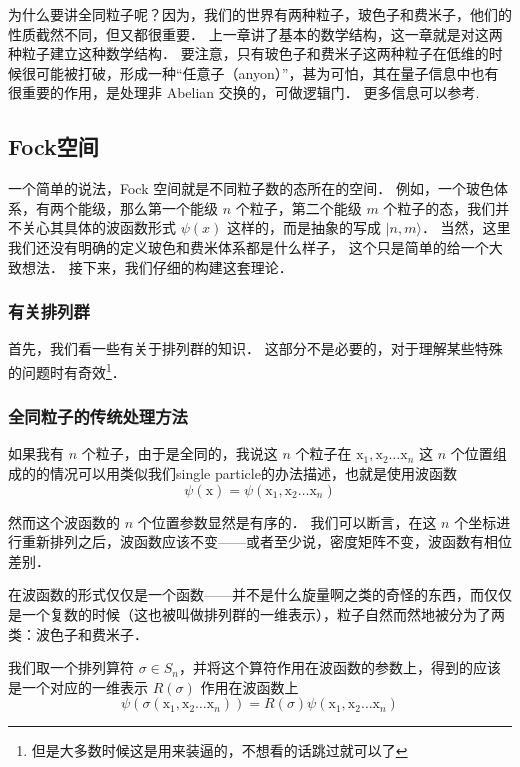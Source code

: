 
为什么要讲全同粒子呢？因为，我们的世界有两种粒子，玻色子和费米子，他们的性质截然不同，但又都很重要． 上一章讲了基本的数学结构，这一章就是对这两种粒子建立这种数学结构． 要注意，只有玻色子和费米子这两种粒子在低维的时候很可能被打破，形成一种“任意子（anyon）”，甚为可怕，其在量子信息中也有很重要的作用，是处理非 Abelian 交换的，可做逻辑门． 更多信息可以参考\cite{Nayak2008}.

\subsection{Fock空间}

一个简单的说法，Fock 空间就是不同粒子数的态所在的空间． 例如，一个玻色体系，有两个能级，那么第一个能级 $n$ 个粒子，第二个能级 $m$ 个粒子的态，我们并不关心其具体的波函数形式 $\psi(x)$ 这样的，而是抽象的写成 $|n,m\rangle$． 当然，这里我们还没有明确的定义玻色和费米体系都是什么样子， 这个只是简单的给一个大致想法． 接下来，我们仔细的构建这套理论．

\subsubsection{有关排列群}

首先，我们看一些有关于排列群的知识． 这部分不是必要的，对于理解某些特殊的问题时有奇效\footnote{但是大多数时候这是用来装逼的，不想看的话跳过就可以了}．

\subsubsection{全同粒子的传统处理方法}

如果我有 $n$ 个粒子，由于是全同的，我说这 $n$ 个粒子在 ${\mathrm x}_1, {\mathrm x}_2 \dots {\mathrm x}_n$ 这 $n$ 个位置组成的的情况可以用类似我们single particle的办法描述，也就是使用波函数
\begin{equation}
\psi({\mathrm x}) = \psi({\mathrm x}_1, {\mathrm x}_2\dots {\mathrm x}_n)
\end{equation}

然而这个波函数的 $n$ 个位置参数显然是有序的． 我们可以断言，在这 $n$ 个坐标进行重新排列之后，波函数应该不变——或者至少说，密度矩阵不变，波函数有相位差别．

在波函数的形式仅仅是一个函数——并不是什么旋量啊之类的奇怪的东西，而仅仅是一个复数的时候（这也被叫做排列群的一维表示），粒子自然而然地被分为了两类：波色子和费米子．

我们取一个排列算符 $\sigma\in S_n$，并将这个算符作用在波函数的参数上，得到的应该是一个对应的一维表示 $R(\sigma)$ 作用在波函数上
\begin{equation}
\psi(\sigma ({\mathrm x}_1, {\mathrm x}_2\dots{\mathrm x}_n)) = R(\sigma)\psi({\mathrm x}_1, {\mathrm x}_2\dots{\mathrm x}_n)
\end{equation}

